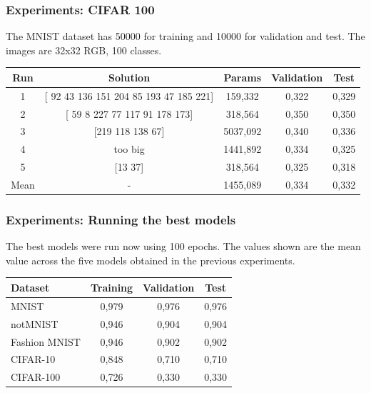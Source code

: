 \documentclass[aspectratio=169]{beamer}
\begin{document}
		\begin{frame}
			\frametitle{Experiments: CIFAR 100}
			
			The MNIST dataset has 50000 for training and 10000 for validation and test. The images are 32x32 RGB, 100 classes.
		
			\begin{table}
				\begin{tabular}{c|c|c|c|c}
					\hline
					Run  &                 Solution                  &  Params  & Validation & Test  \\ \hline
					 1   & [ 92  43 136 151 204  85 193  47 185 221] & 159,332  &   0,322    & 0,329 \\
					 2   &     [ 59   8 227  77 117  91 178 173]     & 318,564  &   0,350    & 0,350 \\
					 3   &             [219 118 138  67]             & 5037,092 &   0,340    & 0,336 \\
					 4   &                  too big                  & 1441,892 &   0,334    & 0,325 \\
					 5   &                  [13 37]                  & 318,564  &   0,325    & 0,318 \\
					Mean &                     -                     & 1455,089 &   0,334    & 0,332 \\ \hline
				\end{tabular}
			\end{table}
		
		\end{frame}
		\begin{frame}
			\frametitle{Experiments: Running the best models}
			
			The best models were run now using 100 epochs. The values shown are the mean value across the five models obtained in the previous experiments.
			
			\begin{table}
				\begin{tabular}{l|c|c|c}
					\hline
					   Dataset    & Training & Validation & Test  \\ \hline
					    MNIST     &  0,979   &   0,976    & 0,976 \\
					  notMNIST    &  0,946   &   0,904    & 0,904 \\
					Fashion MNIST &  0,946   &   0,902    & 0,902 \\
					  CIFAR-10    &  0,848   &   0,710    & 0,710 \\
					  CIFAR-100   &  0,726   &   0,330    & 0,330 \\ \hline
				\end{tabular}
			\end{table}
		
		\end{frame}
\end{document}

